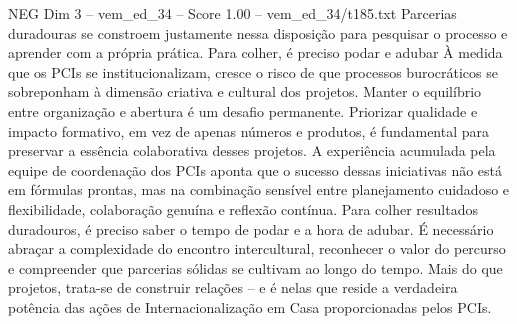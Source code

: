 \begin{textsample}{NEG Dim 3 – vem\_ed\_34 – Score 1.00 – vem\_ed\_34/t185.txt}
Parcerias duradouras se constroem justamente nessa disposição para pesquisar o processo e aprender com a própria prática.
Para colher, é preciso podar e adubar À medida que os PCIs se institucionalizam, cresce o risco de que processos burocráticos se sobreponham à dimensão criativa e cultural dos projetos.
Manter o equilíbrio entre organização e abertura é um desafio permanente.
Priorizar qualidade e impacto formativo, em vez de apenas números e produtos, é fundamental para preservar a essência colaborativa desses projetos.
A experiência acumulada pela equipe de coordenação dos PCIs aponta que o sucesso dessas iniciativas não está em fórmulas prontas, mas na combinação sensível entre planejamento cuidadoso e flexibilidade, colaboração genuína e reflexão contínua.
Para colher resultados duradouros, é preciso saber o tempo de podar e a hora de adubar.
É necessário abraçar a complexidade do encontro intercultural, reconhecer o valor do percurso e compreender que parcerias sólidas se cultivam ao longo do tempo.
Mais do que projetos, trata-se de construir relações – e é nelas que reside a verdadeira potência das ações de Internacionalização em Casa proporcionadas pelos PCIs.

\end{textsample}
